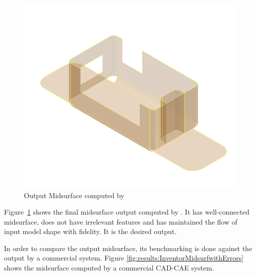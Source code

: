 
\begin{figure}[!h]
\centering     %
\includegraphics[width=0.62\linewidth,valign=t]{images/SheetMetal_Medium_Enclosure_final_midsurf_part}
\caption{Output Midsurface computed by \mysystemname}
\label{fig:results:outputmidsurfenclosure}
\end{figure}


Figure~\ref{fig:results:outputmidsurfenclosure} shows the final midsurface output computed by \mysystemname.  It has well-connected midsurface, does not have irrelevant features and has maintained the flow of input model shape with fidelity. It is the desired output.

%
%

In order to compare the output midsurface, its benchmarking is done against the output by a commercial system. Figure \ref{fig:results:InventorMidsurfwithErrors} shows the midsurface computed by a commercial CAD-CAE system.





